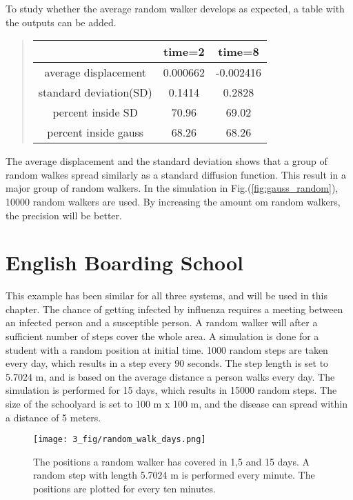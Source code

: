 \documentclass[%
twoside,                 %
final,                   %
chapterprefix=true,      %
open=right               %
10pt]{book}
\begin{document}
To study whether the average random walker develops as expected, a table with the outputs can be added. 

\label{table:gauss_random}

\begin{quote}
\begin{tabular}{ccc}
\hline
\multicolumn{1}{c}{  } & \multicolumn{1}{c}{ time=2 } & \multicolumn{1}{c}{ time=8 } \\
\hline
average displacement   & 0.000662 & -0.002416 \\
standard deviation(SD) & 0.1414   & 0.2828    \\
percent inside SD      & 70.96    & 69.02     \\
percent inside gauss   & 68.26    & 68.26     \\
\hline
\end{tabular}
\end{quote}

\noindent
The average displacement and the standard deviation shows that a group of random walkes spread similarly as a standard diffusion function. This result in a major group of random walkers. In the simulation in Fig.(\ref{fig:gauss_random}), 10000 random walkers are used. By increasing the amount om random walkers, the precision will be better.

\section{English Boarding School}
This example has been similar for all three systems, and will be used in this chapter. The chance of getting infected by influenza requires a meeting between an infected person and a susceptible person. A random walker will after a sufficient number of steps cover the whole area. A simulation is done for a student with a random position at initial time. 1000 random steps are taken every day, which results in a step every 90 seconds. The step length is set to 5.7024 m, and is based on the average distance a person walks every day. The simulation is performed for 15 days, which results in 15000 random steps. The size of the schoolyard is set to 100 m x 100 m, and the disease can spread within a distance of 5 meters.


\begin{figure}[ht]
  \centerline{\texttt{[image: 3\_fig/random\_walk\_days.png]}}
  \caption{
  \label{fig:random_walker_days} The positions a random walker has covered in 1,5 and 15 days. A random step with length 5.7024 m is performed every minute. The positions are plotted for every ten minutes.
  }
\end{figure}
\end{document}

